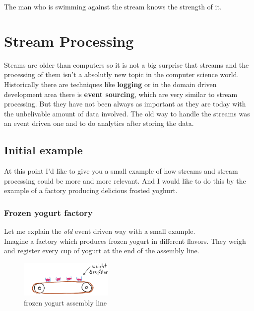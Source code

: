 \begin{savequote}[75mm]
The man who is swimming against the stream knows the strength of it.
\end{savequote}

\chapter{Stream Processing}
Steams are older than computers so it is not a big surprise that streams
and the processing of them isn't a absolutly new topic in the computer science world.
Historically there are techniques like \textbf{logging} or in the domain driven development area there is \textbf{event sourcing},
which are very similar to stream processing.
But they have not been always as important as they are today with the unbelivable amount of data involved.
The old way to handle the streams was an event driven one and to do analytics after storing the data.\\


\section{Initial example}
At this point I'd like to give you a small example of how streams and stream processing could be more and more
relevant. And I would like to do this by the example of a factory producing delicious frosted yoghurt.

\newpage

\subsection{Frozen yogurt factory}
Let me explain the \textit{old} event driven way with a small example.\\
Imagine a factory which produces frozen yogurt in different flavors.
They weigh and register every cup of yogurt at the end of the assembly line.\\

\begin{figure}[H]
\centering
\captionsetup{justification=centering}
\includegraphics[width=0.4\textwidth]{images/cups.png}
\caption[Frozen yogurt assembly line]{frozen yogurt assembly line}
\end{figure}

